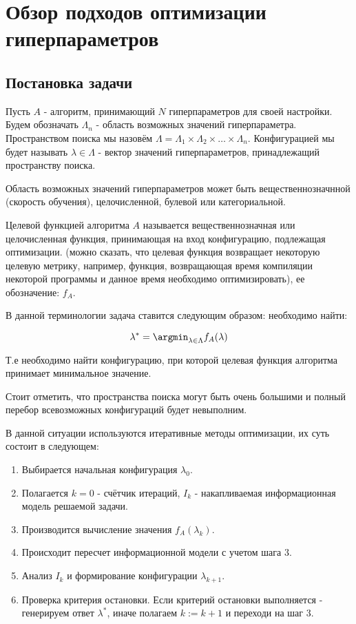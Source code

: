 \section{Обзор подходов оптимизации гиперпараметров}

\subsection{Постановка задачи}

Пусть $A$ - алгоритм, принимающий $N$ гиперпараметров для своей настройки. Будем обозначать $\Lambda_n$ - область возможных значений гиперпараметра. Пространством поиска мы назовём $\Lambda = \Lambda_1 \times \Lambda_2 \times \dots \times \Lambda_n$. Конфигурацией мы будет называть $\lambda \in \Lambda$ - вектор значений гиперпараметров, принадлежащий пространству поиска. 

Область возможных значений гиперпараметров может быть вещественнозначнной (скорость обучения), целочисленной, булевой или категориальной. 

Целевой функцией алгоритма $A$ называется вещественнозначная или целочисленная функция, принимающая на вход конфигурацию, подлежащая оптимизации. (можно сказать, что целевая функция возвращает некоторую целевую метрику, например, функция, возвращающая время компиляции некоторой программы и данное время необходимо оптимизировать), ее обозначение: $f_A$.


В данной терминологии задача ставится следующим образом: необходимо найти: 

\begin{equation}
	\lambda^* = \argmin_{\lambda \in \Lambda} f_A(\lambda)
\end{equation}

Т.е необходимо найти конфигурацию, при которой целевая функция алгоритма принимает минимальное значение. 

Стоит отметить, что пространства поиска могут быть очень большими и полный перебор всевозможных конфигураций будет невыполним. 

В данной ситуации используются итеративные методы оптимизации, их суть состоит в следующем: 

\begin{enumerate}
	\item Выбирается начальная конфигурация $\lambda_0$.
	\item Полагается $k=0$ - счётчик итераций, $I_k$ - накапливаемая информационная модель решаемой задачи.
	\item Производится вычисление значения $f_A(\lambda_k)$.
	\item Происходит пересчет информационной модели с учетом шага 3. 
	\item Анализ $I_k$ и формирование конфигурации $\lambda_{k+1}$.
	\item Проверка критерия остановки. Если критерий остановки выполняется - генерируем ответ $\lambda^*$, иначе полагаем $k:=k+1$ и переходи на шаг 3.
\end{enumerate}

\clearpage